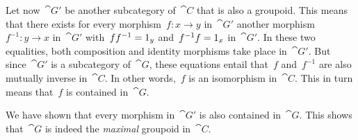 Let now~$\cat{G}'$ be another subcategory of~$\cat{C}$ that is also a groupoid.
This means that there exists for every morphism~$f \colon x \to y$ in~$\cat{G}'$ another morphism~$f^{-1} \colon y \to x$ in~$\cat{G}'$ with~$f f^{-1} = 1_y$ and~$f^{-1} f = 1_x$ in~$\cat{G}'$.
In these two equalities, both composition and identity morphisms take place in~$\cat{G}'$.
But since~$\cat{G}'$ is a subcategory of~$\cat{G}$, these equations entail that~$f$ and~$f^{-1}$ are also mutually inverse in~$\cat{C}$.
In other words,~$f$ is an isomorphism in~$\cat{C}$.
This in turn means that~$f$ is contained in~$\cat{G}$.

We have shown that every morphism in~$\cat{G}'$ is also contained in~$\cat{G}$.
This shows that~$\cat{G}$ is indeed the \emph{maximal} groupoid in~$\cat{C}$.
